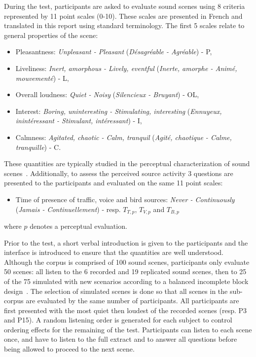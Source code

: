 \documentclass[twocolumn]{article}
\begin{document}
During the test, participants are asked to evaluate sound scenes using 8 criteria represented by 11 point scales (0-10). These scales are presented in French and translated in this report using standard terminology. The first 5 scales relate to general properties of the scene:
\begin{itemize}
\item Pleasantness: \textit{Unpleasant - Pleasant} (\textit{D\'esagr\'eable - Agr\'eable}) - P,
\item Liveliness: \textit{Inert, amorphous - Lively, eventful} (\textit{Inerte, amorphe - Anim\'e, mouvement\'e}) - L,
\item Overall loudness: \textit{Quiet - Noisy} (\textit{Silencieux - Bruyant}) - OL,
\item Interest: \textit{Boring, uninteresting - Stimulating, interesting} (\textit{Ennuyeux, inint\'eressant - Stimulant, int\'eressant}) - I,
\item Calmness: \textit{Agitated, chaotic - Calm, tranquil} (\textit{Agit\'e, chaotique - Calme, tranquille}) - C.
\end{itemize}

These quantities are typically studied in the perceptual characterization of sound scenes~\cite{axelsson2010, aumond2017, nilsson2007}. Additionally, to assess the perceived source activity 3 questions are presented to the participants and evaluated on the same 11 point scales:
\begin{itemize}
\item Time of presence of traffic, voice and bird sources: \textit{Never - Continuously} (\textit{Jamais - Continuellement}) - resp. $T_{T, p}$, $T_{V, p}$ and $T_{B, p}$
\end{itemize}
where $p$ denotes a perceptual evaluation.

Prior to the test, a short verbal introduction is given to the participants and the interface is introduced to ensure that the quantities are well understood. Although the corpus is comprised of 100 sound scenes, participants only evaluate 50 scenes: all listen to the 6 recorded and 19 replicated sound scenes, then to 25 of the 75 simulated with new scenarios according to a balanced incomplete block design~\cite{dagnelie2003}. The selection of simulated scenes is done so that all scenes in the sub-corpus are evaluated by the same number of participants. All participants are first presented with the most quiet then loudest of the recorded scenes (resp. P3 and P15). A random listening order is generated for each subject to control ordering effects for the remaining of the test. Participants can listen to each scene once, and have to listen to the full extract and to answer all questions before being allowed to proceed to the next scene.
\end{document}
